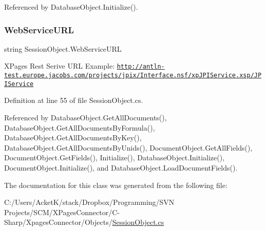 Referenced by Database\+Object.\+Initialize().

\mbox{\label{class_session_object_a697c071c812fbf7ad1166b896fb44c16}} 
\subsubsection{\texorpdfstring{Web\+Service\+U\+RL}{WebServiceURL}}
{\footnotesize\ttfamily string Session\+Object.\+Web\+Service\+U\+RL\hspace{0.3cm}{\ttfamily [get]}}



X\+Pages Rest Serive U\+RL Example\+: \href{http://antln-test.europe.jacobs.com/projects/jpix/Interface.nsf/xpJPIService.xsp/JPIService}{\tt http\+://antln-\/test.\+europe.\+jacobs.\+com/projects/jpix/\+Interface.\+nsf/xp\+J\+P\+I\+Service.\+xsp/\+J\+P\+I\+Service} 



Definition at line 55 of file Session\+Object.\+cs.



Referenced by Database\+Object.\+Get\+All\+Documents(), Database\+Object.\+Get\+All\+Documents\+By\+Formula(), Database\+Object.\+Get\+All\+Documents\+By\+Key(), Database\+Object.\+Get\+All\+Documents\+By\+Unids(), Document\+Object.\+Get\+All\+Fields(), Document\+Object.\+Get\+Fields(), Initialize(), Database\+Object.\+Initialize(), Document\+Object.\+Initialize(), and Database\+Object.\+Load\+Document\+Fields().



The documentation for this class was generated from the following file\+:\begin{DoxyCompactItemize}
\item 
C\+:/\+Users/\+Acket\+K/stack/\+Dropbox/\+Programming/\+S\+V\+N Projects/\+S\+C\+M/\+X\+Pages\+Connector/\+C-\/\+Sharp/\+Xpages\+Connector/\+Objects/\hyperlink{_session_object_8cs}{Session\+Object.\+cs}\end{DoxyCompactItemize}
